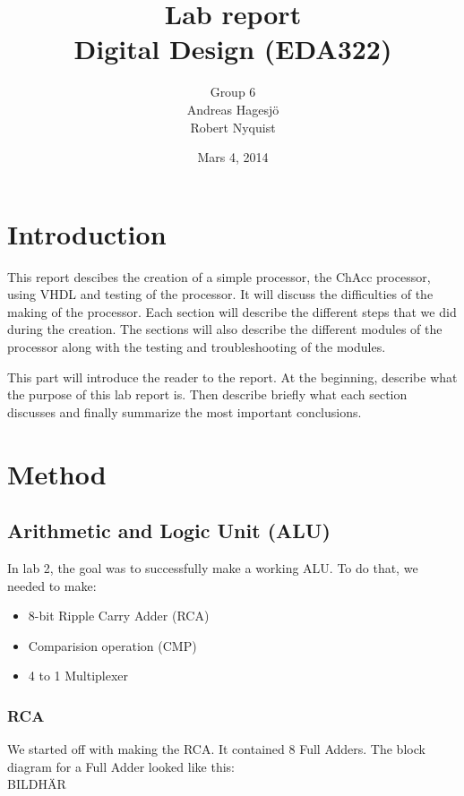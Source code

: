 \documentclass[a4paper]{article}
\title{\bf \LARGE Lab report\\
Digital Design (EDA322)}
\author{Group 6
\vspace{0.4cm}\\
Andreas Hagesjö \\ Robert Nyquist}
\date{Mars 4, 2014}
\begin{document}
\maketitle
\thispagestyle{empty}
\newpage
\tableofcontents
\thispagestyle{empty}
\newpage

\setcounter {page}{1}
\section{Introduction}
This report descibes the creation of a simple processor, the ChAcc processor, using VHDL and testing of the processor.
It will discuss the difficulties of the making of the processor.
Each section will describe the different steps that we did during the creation. The sections will also describe the different modules of the processor along with the testing and troubleshooting of the modules.



This part will introduce the reader to the report.
At the beginning, describe what the purpose of this lab report is. Then
describe briefly what each section discusses and finally summarize the most
important conclusions.

\section{Method}
\subsection{Arithmetic and Logic Unit (ALU)}

In lab 2, the goal was to successfully make a working ALU. To do that, we needed to make:

\begin{itemize}

  \item 8-bit Ripple Carry Adder (RCA)
  \item Comparision operation (CMP)
  \item 4 to 1 Multiplexer

\end{itemize}

\subsubsection{RCA}
We started off with making the RCA. It contained 8 Full Adders.
The block diagram for a Full Adder looked like this:\\
BILDHÄR\\
\end{document}

